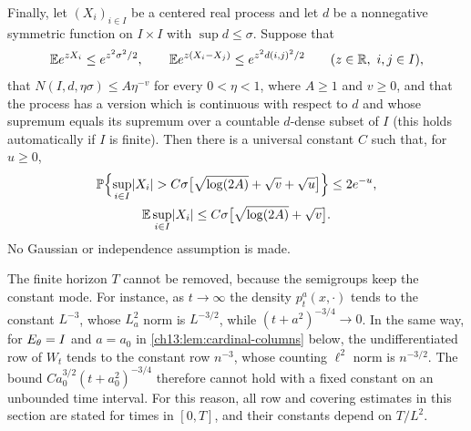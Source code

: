 \begin{lemma}
Finally, let $(X_i)_{i\in I}$ be a centered real process and let $d$ be a nonnegative symmetric function on $I\times I$ with $\sup d\le\sigma$. Suppose that
\[
 \mathbb E e^{zX_i}\le e^{z^2\sigma^2/2},\qquad\mathbb E e^{z(X_i-X_j)}\le e^{z^2d(i,j)^2/2}\qquad(z\in\mathbb R,\ i,j\in I),
\]
that $N(I,d,\eta\sigma)\le A\eta^{-v}$ for every $0<\eta<1$, where $A\ge1$ and $v\ge0$, and that the process has a version which is continuous with respect to $d$ and whose supremum equals its supremum over a countable $d$-dense subset of $I$ (this holds automatically if $I$ is finite). Then there is a universal constant $C$ such that, for $u\ge0$,
\[
 \begin{gathered}
 \mathbb P\Bigl\{\sup_{i\in I}\lvert X_i\rvert>C\sigma\bigl[\sqrt{\log(2A)}+\sqrt v+\sqrt u\bigr]\Bigr\}\le2e^{-u},\\
 \mathbb E\sup_{i\in I}\lvert X_i\rvert\le C\sigma\bigl[\sqrt{\log(2A)}+\sqrt v\bigr].
 \end{gathered}
\]
No Gaussian or independence assumption is made.
\end{lemma}

\begin{remark}\label{ch13:rem:horizon}
The finite horizon $T$ cannot be removed, because the semigroups keep the constant mode. For instance, as $t\to\infty$ the density $p_t^a(x,\cdot)$ tends to the constant $L^{-3}$, whose $L^2_a$ norm is $L^{-3/2}$, while $(t+a^2)^{-3/4}\to0$. In the same way, for $E_\theta=I$ and $a=a_0$ in \cref{ch13:lem:cardinal-columns} below, the undifferentiated row of $W_t$ tends to the constant row $n^{-3}$, whose counting $\ell^2$ norm is $n^{-3/2}$. The bound $Ca_0^{3/2}(t+a_0^2)^{-3/4}$ therefore cannot hold with a fixed constant on an unbounded time interval. For this reason, all row and covering estimates in this section are stated for times in $[0,T]$, and their constants depend on $T/L^2$.
\end{remark}

